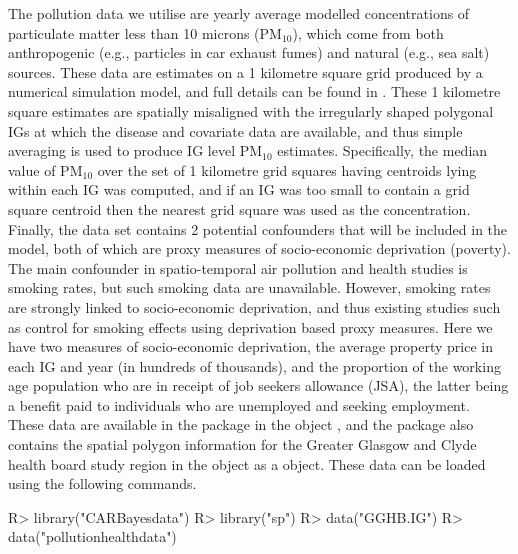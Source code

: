 \documentclass[article, nojss]{jss}
\begin{document}
The pollution data we utilise are yearly average modelled concentrations of particulate matter less than 10 microns (PM$_{10}$), which come from both anthropogenic (e.g., particles in car exhaust fumes) and natural (e.g., sea salt) sources. These data are estimates on a 1 kilometre square grid produced by a numerical simulation model, and full details can be found in \cite{ricardo2015}. These 1 kilometre square estimates are spatially misaligned with the irregularly shaped polygonal IGs at which the disease and covariate data are available, and thus simple averaging is used to produce IG level PM$_{10}$ estimates. Specifically, the median value of PM$_{10}$ over the set of 1 kilometre grid squares having centroids lying within each IG was computed, and if an IG was too small to contain a grid square centroid then the nearest grid square was used as the concentration.\\

Finally, the data set contains 2 potential confounders that will be included in the model, both of which are proxy measures of socio-economic deprivation (poverty). The main confounder in spatio-temporal air pollution and health studies is smoking rates, but such smoking data are unavailable. However, smoking rates are strongly linked to socio-economic deprivation, and thus existing studies such as \cite{haining2010} control for smoking effects using deprivation based proxy measures. Here we have two measures of socio-economic deprivation, the average property price in each IG and year (in hundreds of thousands), and the proportion of the working age population who are in receipt of job seekers allowance (JSA), the latter being a benefit paid to individuals who are unemployed and seeking employment.\\

These data are available in the  package in the object , and the package also contains the spatial polygon information for the Greater Glasgow and Clyde health board study region in the object  as a  object. These data can be loaded using the following commands.




\begin{Schunk}
\begin{Sinput}
R> library("CARBayesdata")
R> library("sp")
R> data("GGHB.IG")
R> data("pollutionhealthdata")
\end{Sinput}
\end{Schunk}
\end{document}
